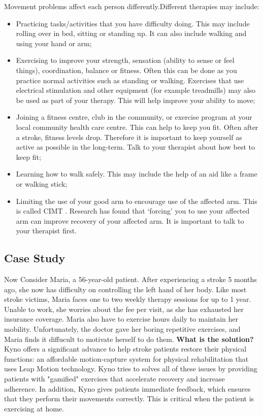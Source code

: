 Movement problems affect each person differently.Different therapies may include:
\begin{itemize}
\item Practicing tasks/activities that you have difficulty doing. This may include rolling over in bed, sitting or standing up. It can also include walking and using your hand or arm;

\item Exercising to improve your strength, sensation (ability to sense or feel things), coordination, balance or fitness. Often this can be done as you practice normal activities such as standing or walking. Exercises that use electrical stimulation and other equipment (for example treadmills) may also be used as part of your therapy. This will help improve your ability to move;

\item Joining a fitness centre, club in the community, or exercise program at your local community health care centre. This can help to keep you fit. Often after a stroke, fitness levels drop. Therefore it is important to keep yourself as active as possible in the long-term. Talk to your therapist about how best to keep fit;

\item Learning how to walk safely. This may include the help of an aid like a frame or walking stick;

\item Limiting the use of your good arm to encourage use of the affected arm. This is called CIMT \cite{constrain}. Research has found that ‘forcing’ you to use your affected arm can improve recovery of your affected arm. It is important to talk to your therapist first.
\end{itemize}





\subsection{Case Study}
Now Consider Maria, a 56-year-old patient. After experiencing a stroke 5 months ago, she now has difficulty on controlling the left hand of her body. Like most stroke victims, Maria faces one to two weekly therapy sessions for up to 1 year. Unable to work, she worries about the fee per visit, as she has exhausted her insurance coverage. Maria also have to exercise hours daily to maintain her mobility. Unfortunately, the doctor gave her boring repetitive exercises, and Maria finds it diffucult to motivate herself to do them.
\textbf{What is the solution?}
Kyno offers a significant advance to help stroke patients restore their physical functions: an affordable motion-capture system for physical rehabilitation that uses Leap Motion technology.
Kyno tries to solves all of these issues by providing patients with "gamified" exercises that accelerate recovery and increase adherence. In addition, Kyno gives patients immediate feedback, which ensures that they perform their movements correctly. This is critical when the patient is exercising at home.


